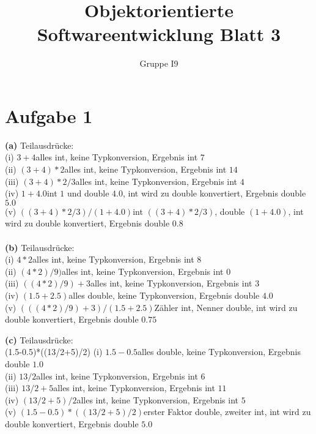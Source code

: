 \documentclass[]{article}
\title{Objektorientierte Softwareentwicklung Blatt 3}
\author{Gruppe I9}
\date{}
\begin{document}
\maketitle \section*{Aufgabe 1}\textbf{(a)}
Teilausdrücke:\\
(i) $3+4$\quad\quad alles int, keine Typkonversion, Ergebnis int $7$\\
(ii) $(3+4)*2$\quad\quad alles int, keine Typkonversion, Ergebnis int $14$\\
(iii) $(3+4)*2/3$\quad\quad alles int, keine Typkonversion, Ergebnis int $4$\\
(iv) $1+4.0$\quad\quad int $1$ und double $4.0$, int wird zu double konvertiert, Ergebnis double $5.0$\\
(v) $((3+4)*2/3)/(1+4.0)$\quad\quad int $((3+4)*2/3)$, double $(1+4.0)$, int wird zu double konvertiert, Ergebnis double $0.8$\\\\

\textbf{(b)}
Teilausdrücke:\\
(i) $4*2$\quad\quad alles int, keine Typkonversion, Ergebnis int $8$\\
(ii) $(4*2)/9)$\quad\quad alles int, keine Typkonversion, Ergebnis int $0$\\
(iii) $((4*2)/9)+3$\quad\quad alles int, keine Typkonversion, Ergebnis int $3$\\
(iv) $(1.5+2.5)$\quad\quad alles double, keine Typkonversion, Ergebnis double $4.0$\\
(v) $(((4*2)/9)+3)/(1.5+2.5)$\quad\quad Zähler int, Nenner double, int wird zu double konvertiert, Ergebnis double $0.75$

\textbf{(c)}
Teilausdrücke:\\(1.5-0.5)*((13/2+5)/2)
(i) $1.5-0.5$\quad\quad alles double, keine Typkonversion, Ergebnis double $1.0$\\
(ii) $13/2$\quad\quad alles int, keine Typkonversion, Ergebnis int $6$\\
(iii) $13/2+5$\quad\quad alles int, keine Typkonversion, Ergebnis int $11$\\
(iv) $(13/2+5)/2$\quad\quad alles int, keine Typkonversion, Ergebnis int $5$\\
(v) $(1.5-0.5)*((13/2+5)/2)$\quad\quad erster Faktor double, zweiter int, int wird zu double konvertiert, Ergebnis double $5.0$
\end{document}
